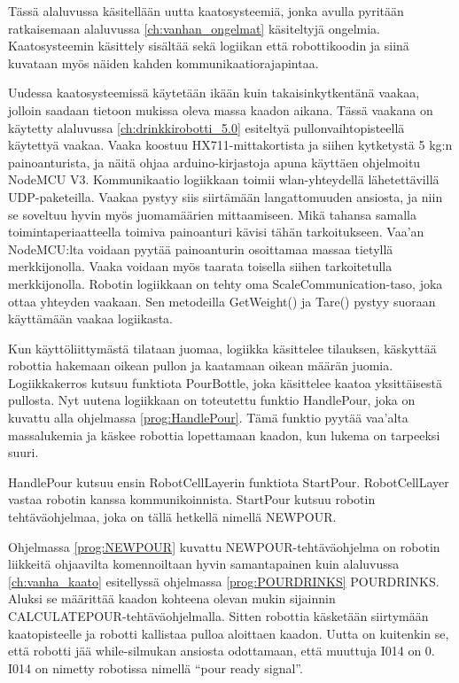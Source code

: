 Tässä alaluvussa käsitellään uutta kaatosysteemiä, jonka avulla pyritään ratkaisemaan alaluvussa \ref{ch:vanhan_ongelmat} käsiteltyjä ongelmia. Kaatosysteemin käsittely sisältää sekä logiikan että robottikoodin ja siinä kuvataan myös näiden kahden kommunikaatiorajapintaa.

Uudessa kaatosysteemissä käytetään ikään kuin takaisinkytkentänä vaakaa, jolloin saadaan tietoon mukissa oleva massa kaadon aikana. Tässä vaakana on käytetty alaluvussa \ref{ch:drinkkirobotti_5.0} esiteltyä pullonvaihtopisteellä käytettyä vaakaa. Vaaka koostuu HX711\hyp{}mittakortista ja siihen kytketystä 5 kg:n painoanturista, ja näitä ohjaa arduino\hyp{}kirjastoja apuna käyttäen ohjelmoitu NodeMCU V3. Kommunikaatio logiikkaan toimii wlan\hyp{}yhteydellä lähetettävillä UDP\hyp{}paketeilla. \cite{Virtanen2019} Vaakaa pystyy siis siirtämään langattomuuden ansiosta, ja niin se soveltuu hyvin myös juomamäärien mittaamiseen. Mikä tahansa samalla toimintaperiaatteella toimiva painoanturi kävisi tähän tarkoitukseen. Vaa'an NodeMCU:lta voidaan pyytää painoanturin osoittamaa massaa tietyllä merkkijonolla. Vaaka voidaan myös taarata toisella siihen tarkoitetulla merkkijonolla. Robotin logiikkaan on tehty oma ScaleCommunication-taso, joka ottaa yhteyden vaakaan. Sen metodeilla GetWeight() ja Tare() pystyy suoraan käyttämään vaakaa logiikasta.

Kun käyttöliittymästä tilataan juomaa, logiikka käsittelee tilauksen, käskyttää robottia hakemaan oikean pullon ja kaatamaan oikean määrän juomia. Logiikkakerros kutsuu funktiota PourBottle, joka käsittelee kaatoa yksittäisestä pullosta. Nyt uutena logiikkaan on toteutettu funktio HandlePour, joka on kuvattu alla ohjelmassa \ref{prog:HandlePour}. Tämä funktio pyytää vaa'alta massalukemia ja käskee robottia lopettamaan kaadon, kun lukema on tarpeeksi suuri.

\newpage

\lstset{style=sharpc}


HandlePour kutsuu ensin RobotCellLayerin funktiota StartPour. RobotCellLayer vastaa robotin kanssa kommunikoinnista. StartPour kutsuu robotin tehtäväohjelmaa, joka on tällä hetkellä nimellä NEWPOUR.

\lstset{style=Yaskawatyyli}


Ohjelmassa \ref{prog:NEWPOUR} kuvattu NEWPOUR\hyp{}tehtäväohjelma on robotin liikkeitä ohjaavilta komennoiltaan hyvin samantapainen kuin alaluvussa \ref{ch:vanha_kaato} esitellyssä ohjelmassa \ref{prog:POURDRINKS} POURDRINKS. Aluksi se määrittää kaadon kohteena olevan mukin sijainnin CALCULATEPOUR\hyp{}tehtäväohjelmalla. Sitten robottia käsketään siirtymään kaatopisteelle ja robotti kallistaa pulloa aloittaen kaadon. Uutta on kuitenkin se, että robotti jää while\hyp{}silmukan ansiosta odottamaan, että muuttuja I014 on 0. I014 on nimetty robotissa nimellä ``pour ready signal''.

